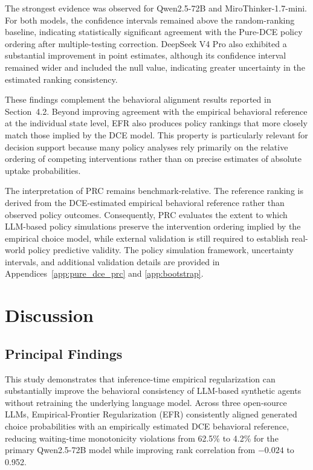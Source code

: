 \documentclass[11pt]{article}
\begin{document}
The strongest evidence was observed for Qwen2.5-72B and MiroThinker-1.7-mini. For both models, the confidence intervals remained above the random-ranking baseline, indicating statistically significant agreement with the Pure-DCE policy ordering after multiple-testing correction. DeepSeek V4 Pro also exhibited a substantial improvement in point estimates, although its confidence interval remained wider and included the null value, indicating greater uncertainty in the estimated ranking consistency.

These findings complement the behavioral alignment results reported in Section~4.2. Beyond improving agreement with the empirical behavioral reference at the individual state level, EFR also produces policy rankings that more closely match those implied by the DCE model. This property is particularly relevant for decision support because many policy analyses rely primarily on the relative ordering of competing interventions rather than on precise estimates of absolute uptake probabilities.

The interpretation of PRC remains benchmark-relative. The reference ranking is derived from the DCE-estimated empirical behavioral reference rather than observed policy outcomes. Consequently, PRC evaluates the extent to which LLM-based policy simulations preserve the intervention ordering implied by the empirical choice model, while external validation is still required to establish real-world policy predictive validity.
The policy simulation framework, uncertainty intervals, and additional validation details are provided in Appendices~\ref{app:pure_dce_prc} and \ref{app:bootstrap}.


\section{Discussion}
\subsection{Principal Findings}

This study demonstrates that inference-time empirical regularization can substantially improve the behavioral consistency of LLM-based synthetic agents without retraining the underlying language model. Across three open-source LLMs, Empirical-Frontier Regularization (EFR) consistently aligned generated choice probabilities with an empirically estimated DCE behavioral reference, reducing waiting-time monotonicity violations from 62.5\% to 4.2\% for the primary Qwen2.5-72B model while improving rank correlation from $-0.024$ to 0.952.
\end{document}
